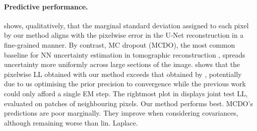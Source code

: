 \paragraph{Predictive performance.}
 shows, qualitatively, that the marginal standard deviation assigned to each pixel by our method aligns with the pixelwise error in the U-Net reconstruction in a fine-grained manner.
By contrast, MC dropout (MCDO), the most common baseline for NN uncertainty estimation in tomographic reconstruction \citep{laves2020uncertainty, Tolle2021meanfield}, spreads uncertainty more uniformly across large sections of the image.
 shows that the pixelwise LL obtained with our method exceeds that obtained by \textcite{antoran2022tomography}, potentially due to us optimising the prior precision to convergence while the previous work could only afford a single EM step. 
The rightmost plot in  displays joint test LL, evaluated on patches of neighbouring pixels. Our method performs best.
MCDO's predictions are poor marginally. They improve when considering covariances, although remaining worse than lin. Laplace. 

\begin{table}[t]
\vspace{-0.2cm}
\caption[Experimental results for tomographic reconstruction]{Tomographic reconstruction: test LL and wall-clock times (A100 GPU) for both data sizes.}
\vspace{0.0cm}
\label{Tab:walnuttab}
\vspace{-0.25cm}
\end{table}


